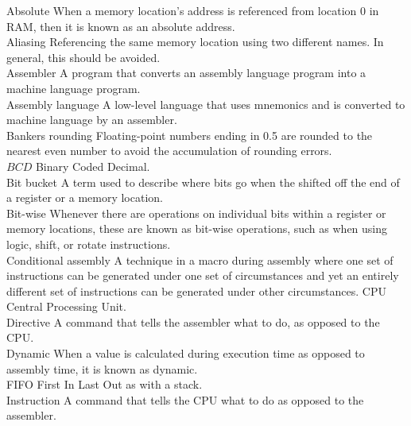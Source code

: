 \documentclass[10pt]{article}
\begin{document}
Absolute When a memory location's address is referenced from location 0 in RAM, then it is known as an absolute address.\\
Aliasing Referencing the same memory location using two different names. In general, this should be avoided.\\
Assembler A program that converts an assembly language program into a machine language program.\\
Assembly language A low-level language that uses mnemonics and is converted to machine language by an assembler.\\
Bankers rounding Floating-point numbers ending in 0.5 are rounded to the nearest even number to avoid the accumulation of rounding errors.\\
$B C D$ Binary Coded Decimal.\\
Bit bucket A term used to describe where bits go when the shifted off the end of a register or a memory location.\\
Bit-wise Whenever there are operations on individual bits within a register or memory locations, these are known as bit-wise operations, such as when using logic, shift, or rotate instructions.\\
Conditional assembly A technique in a macro during assembly where one set of instructions can be generated under one set of circumstances and yet an entirely different set of instructions can be generated under other circumstances. CPU Central Processing Unit.\\
Directive A command that tells the assembler what to do, as opposed to the CPU.\\
Dynamic When a value is calculated during execution time as opposed to assembly time, it is known as dynamic.\\
FIFO First In Last Out as with a stack.\\
Instruction A command that tells the CPU what to do as opposed to the assembler.
\end{document}
